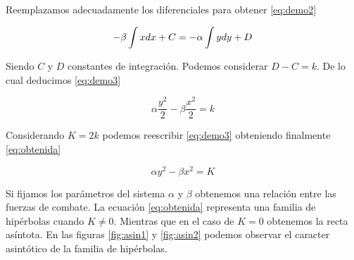 \documentclass{sig-alternate}
\begin{document}
Reemplazamos adecuadamente los diferenciales para obtener \eqref{eq:demo2}

\begin{equation}
-\beta\intop x dx + C =-\alpha\int y dy + D
\label{eq:demo2}
\end{equation}

Siendo $C$ y $D$ constantes de integración. Podemos considerar $D - C = k$. De lo cual deducimos \eqref{eq:demo3}

\begin{equation}
\alpha\frac{y^{2}}{2}-\beta\frac{x^{2}}{2}=k
\label{eq:demo3}
\end{equation}


Considerando $K=2k$ podemos reescribir \eqref{eq:demo3} obteniendo finalmente \eqref{eq:obtenida}

\begin{equation}
\alpha y^{2}-\beta x^{2}=K
\label{eq:obtenida}
\end{equation}

Si fijamos los parámetros del sistema $\alpha$ y $\beta$ obtenemos una relación entre las fuerzas de combate. 
La ecuación \eqref{eq:obtenida} representa una familia de hip\'erbolas cuando $K \ne 0$. 
Mientras que en el caso de $K = 0$ obtenemos la recta asíntota. En las figuras \ref{fig:asin1} y \ref{fig:asin2} podemos observar el caracter asintótico de la familia de hipérbolas.
\end{document}
